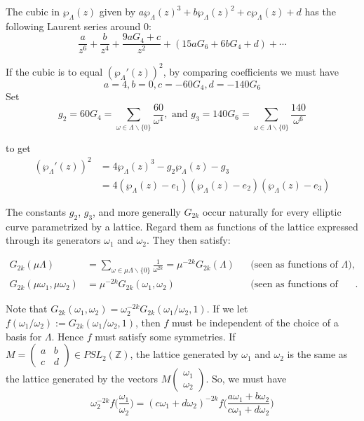 \documentclass[11pt,a4paper]{article}
\begin{document}
The cubic in $\wp_{\Lambda}(z)$ given by $a\wp_{\Lambda}(z)^3 + b\wp_{\Lambda}(z)^2 + c\wp_{\Lambda}(z) + d$ has the following Laurent series around $0$:
$$\frac{a}{z^6}+\frac{b}{z^4} + \frac{9aG_4+c}{z^2} + (15aG_6 + 6bG_4 + d) + \cdots$$

If the cubic is to equal $(\wp_{\Lambda}'(z))^2$, by comparing coefficients we must have
$$a = 4, b = 0, c = -60G_4, d = -140G_6$$
Set
$$g_2 = 60G_4 = \sum_{\omega \in \Lambda\backslash\{0\}} \frac{60}{\omega^4}, \text{ and } g_3 = 140G_6 = \sum_{\omega \in \Lambda\backslash\{0\}} \frac{140}{\omega^6}$$

to get
\begin{equation*}
    \begin{aligned}
        (\wp_{\Lambda}'(z))^2 &=  4\wp_{\Lambda}(z)^3 - g_2\wp_{\Lambda}(z) - g_3\\
        &= 4(\wp_{\Lambda}(z)-e_1)(\wp_{\Lambda}(z)-e_2)(\wp_{\Lambda}(z)-e_3)
    \end{aligned}
\end{equation*}

\begin{sloppypar}
The constants $g_2$, $g_3$, and more generally $G_{2k}$ occur naturally for every elliptic curve parametrized by a lattice. Regard them as functions of the lattice expressed through its generators $\omega_1$ and $\omega_2$. They then satisfy:
\end{sloppypar}
\begin{equation*}
    \begin{aligned}
        G_{2k}(\mu\Lambda)
        &= \sum_{\omega \in \mu\Lambda\backslash\{0\}}\frac{1}{\omega^{2k}}
         = \mu^{-2k}G_{2k}(\Lambda)
        &&\text{(seen as functions of $\Lambda$)},\\
        G_{2k}(\mu\omega_1, \mu\omega_2)
        &= \mu^{-2k}G_{2k}(\omega_1, \omega_2)
        &&\text{(seen as functions of generators)}.
    \end{aligned}
\end{equation*}

Note that $G_{2k}(\omega_1, \omega_2) = \omega_2^{-2k}G_{2k}(\omega_1/\omega_2, 1)$. If we let $f(\omega_1/\omega_2):= G_{2k}(\omega_1/\omega_2, 1)$, then $f$ must be independent of the choice of a basis for $\Lambda$. Hence $f$ must satisfy some symmetries. If $M = \begin{pmatrix}
    a&b\\c&d
\end{pmatrix}\in PSL_2(\mathbb{Z})$, the lattice generated by $\omega_1$ and $\omega_2$ is the same as the lattice generated by the vectors $M\begin{pmatrix}
    \omega_1\\ \omega_2
    \end{pmatrix}$. So, we must have
$$\omega_2^{-2k}f\bigg(\frac{\omega_1}{\omega_2}\bigg) = (c\omega_1+d\omega_2)^{-2k}f\bigg(\frac{a\omega_1+b\omega_2}{c\omega_1+d\omega_2}\bigg)$$
\end{document}
